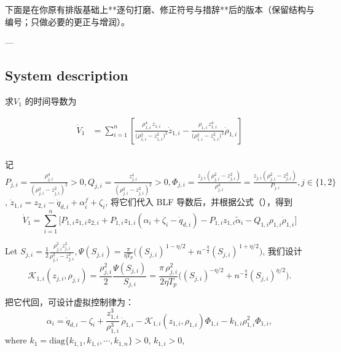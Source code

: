 \documentclass[pdflatex,sn-mathphys-num]{sn-jnl}%
\theoremstyle{thmstyleone}%
\theoremstyle{thmstyletwo}%
\theoremstyle{thmstylethree}%
\begin{document}

下面是在你原有排版基础上**逐句打磨、修正符号与措辞**后的版本（保留结构与编号；只做必要的更正与增润）。

---

\subsection{System description}



求$V_1$ 的时间导数为

\begin{equation}\label{eq:25}
	\begin{aligned}
\dot V_1
&=\sum_{i=1}^{n}\left[
\frac{\rho_{1,i}^4\,z_{1,i}}{\big(\rho_{1,i}^{2}-z_{1,i}^{2}\big)^{2}}\dot z_{1,i}
-
\frac{\rho_{1,i}\,z_{1,i}^{4}}{\big(\rho_{1,i}^{2}-z_{1,i}^{2}\big)^{2}}\dot \rho_{1,i}
\right]\\
\end{aligned}
\end{equation}

记
$
P_{j,i}=\frac{\rho_{j,i}^4}{(\rho_{j,i}^2-z_{j,i}^2)^2}>0,
Q_{j,i}=\frac{ z_{j,i}^4}{(\rho_{j,i}^2-z_{j,i}^2)^2}>0,
\Phi_{j,i}=\frac{z_{j,i}\left(\rho_{j,i}^{2}-z_{j,i}^{2}\right)}{\rho_{j,i}^{4}}=\frac{z_{j,i}(\rho_{j,i}^2-z_{j,i}^2)}{P_{j,i}}, j\in\{1,2\}
$,
$\dot z_{1,i}= z_{2,i}-\dot q_{d,i}+\alpha^{f}_i+\zeta_i$, 将它们代入 BLF 导数后，并根据公式（），得到
$$
\dot V_1=\sum_{i=1}^n\!\Big[P_{1,i} z_{1,i}z_{2,i}+P_{1,i}z_{1,i}(\alpha_i+\zeta_i-\dot q_{d,i})-P_{1,i}z_{1,i}\tilde\alpha_i-Q_{1,i}\rho_{1,i} \dot\rho_{1,i}\Big]
$$

Let ${S_{j,i}}=\frac{1}{2}\frac{\rho_{j,i}^2 z_{j,i}^2}{\rho_{j,i}^2-z_{j,i}^2}, \Psi(S_{j,i})=\frac{\pi}{ \eta T_p}\Big((S_{j,i})^{\,1-\eta/2}+n^{-\frac{\eta}{2} }(S_{j,i})^{\,1+\eta/2}\Big)$, 我们设计
$$
\mathcal{K}_{1,i}(z_{j,i},\rho_{j,i})
=\frac{\rho_{j,i}^2}{2}\frac{\Psi(S_{j,i})}{S_{j,i}}
=\frac{\pi\,\rho_{j,i}^2}{2\eta T_p}\Big((S_{j,i})^{-\eta/2}+n^{-\frac{\eta}{2} }(S_{j,i})^{\eta/2}\Big).
$$

把它代回，可设计虚拟控制律为：
\begin{equation}\label{eq:25}
\alpha_i = \dot q_{d,i}-\zeta_i+\frac{z_{1,i}^3}{\rho_{1,i}^3}\,\dot\rho_{1,i}
-\mathcal{K}_{1,i}(z_{1,i},\rho_{1,i})\Phi_{1,i}
-k_{1,i} \rho_{1,i}^2 \Phi_{1,i},
\end{equation}
where $k_1=\mathrm{diag}\{k_{1,1},k_{1,i},\cdots,k_{1,n}\}>0$, $k_{1,i}>0$,
\end{document}
